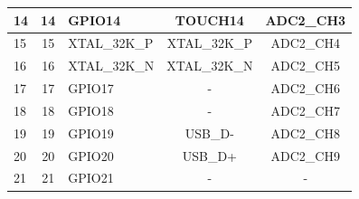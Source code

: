 \begin{longtable}[c]{|p{2.3cm}|c|l|c|c| }
\hline
14 & 14 & GPIO14   & TOUCH14       & ADC2\_CH3              \\
\hline
15 & 15 &  XTAL\_32K\_P & XTAL\_32K\_P           & ADC2\_CH4              \\
\hline
16 & 16 & XTAL\_32K\_N & XTAL\_32K\_N           &  ADC2\_CH5              \\
\hline
17 & 17 & GPIO17 & -           & ADC2\_CH6              \\
\hline
18 & 18 & GPIO18 & -           & ADC2\_CH7              \\
\hline
19 & 19 & GPIO19 & USB\_D-           & ADC2\_CH8              \\
\hline
20 & 20 & GPIO20 & USB\_D+           &  ADC2\_CH9             \\
\hline
21 & 21 & GPIO21 & -           &  -             \\
\hline

\end{longtable}
